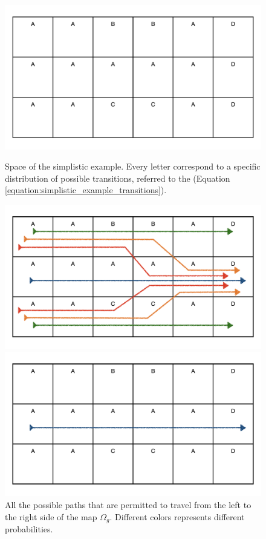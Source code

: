 \documentclass[class=article, crop=false]{standalone}
\begin{document}
\begin{figure}[ht]
\begin{minipage}[c]{0.5\linewidth}
\centering
\includegraphics[scale=0.1]{draw/Thesis_plots/Thesis_plots.001}
\captionsetup{width=.8\linewidth}
\caption{Space of the simplistic example. Every letter correspond to a specific distribution of possible transitions, referred to the (Equation \ref{equation:simplistic_example_transitions}).}
\label{fig:simplistic_example_1}
\end{minipage}
\begin{minipage}[c]{0.5\linewidth}
\centering
\includegraphics[scale=0.1]{draw/Thesis_plots/Thesis_plots.002}
\captionsetup{width=.8\linewidth}
\caption{All the possible paths that are permitted to travel from the left to the right side of the map $\Omega_g$. Different colors represents different probabilities.}
\label{fig:simplistic_example_2}
\end{minipage}
\begin{minipage}[c]{0.5\linewidth}
\centering
\includegraphics[scale=0.1]{draw/Thesis_plots/Thesis_plots.004}

\end{minipage}
\end{figure}
\end{document}
